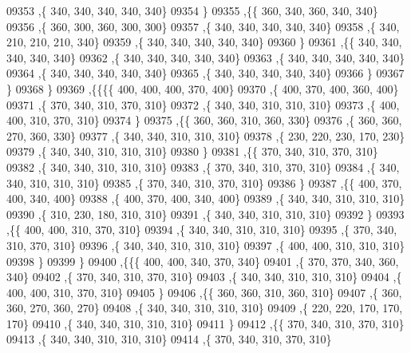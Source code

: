 \begin{DoxyCode}
09353     ,\{   340,   340,   340,   340,   340\}
09354     \}
09355    ,\{\{   360,   340,   360,   340,   340\}
09356     ,\{   360,   300,   360,   300,   300\}
09357     ,\{   340,   340,   340,   340,   340\}
09358     ,\{   340,   210,   210,   210,   340\}
09359     ,\{   340,   340,   340,   340,   340\}
09360     \}
09361    ,\{\{   340,   340,   340,   340,   340\}
09362     ,\{   340,   340,   340,   340,   340\}
09363     ,\{   340,   340,   340,   340,   340\}
09364     ,\{   340,   340,   340,   340,   340\}
09365     ,\{   340,   340,   340,   340,   340\}
09366     \}
09367    \}
09368   \}
09369  ,\{\{\{\{   400,   400,   400,   370,   400\}
09370     ,\{   400,   370,   400,   360,   400\}
09371     ,\{   370,   340,   310,   370,   310\}
09372     ,\{   340,   340,   310,   310,   310\}
09373     ,\{   400,   400,   310,   370,   310\}
09374     \}
09375    ,\{\{   360,   360,   310,   360,   330\}
09376     ,\{   360,   360,   270,   360,   330\}
09377     ,\{   340,   340,   310,   310,   310\}
09378     ,\{   230,   220,   230,   170,   230\}
09379     ,\{   340,   340,   310,   310,   310\}
09380     \}
09381    ,\{\{   370,   340,   310,   370,   310\}
09382     ,\{   340,   340,   310,   310,   310\}
09383     ,\{   370,   340,   310,   370,   310\}
09384     ,\{   340,   340,   310,   310,   310\}
09385     ,\{   370,   340,   310,   370,   310\}
09386     \}
09387    ,\{\{   400,   370,   400,   340,   400\}
09388     ,\{   400,   370,   400,   340,   400\}
09389     ,\{   340,   340,   310,   310,   310\}
09390     ,\{   310,   230,   180,   310,   310\}
09391     ,\{   340,   340,   310,   310,   310\}
09392     \}
09393    ,\{\{   400,   400,   310,   370,   310\}
09394     ,\{   340,   340,   310,   310,   310\}
09395     ,\{   370,   340,   310,   370,   310\}
09396     ,\{   340,   340,   310,   310,   310\}
09397     ,\{   400,   400,   310,   310,   310\}
09398     \}
09399    \}
09400   ,\{\{\{   400,   400,   340,   370,   340\}
09401     ,\{   370,   370,   340,   360,   340\}
09402     ,\{   370,   340,   310,   370,   310\}
09403     ,\{   340,   340,   310,   310,   310\}
09404     ,\{   400,   400,   310,   370,   310\}
09405     \}
09406    ,\{\{   360,   360,   310,   360,   310\}
09407     ,\{   360,   360,   270,   360,   270\}
09408     ,\{   340,   340,   310,   310,   310\}
09409     ,\{   220,   220,   170,   170,   170\}
09410     ,\{   340,   340,   310,   310,   310\}
09411     \}
09412    ,\{\{   370,   340,   310,   370,   310\}
09413     ,\{   340,   340,   310,   310,   310\}
09414     ,\{   370,   340,   310,   370,   310\}

\end{DoxyCode}
